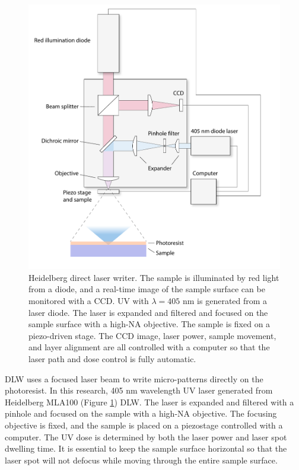 \documentclass[pdflatex, sectionletters, 12pt, final, phd]{pittetd}    %
\begin{document}
\begin{figure}[hp]
	\centering
	\includegraphics[width=1.0\textwidth]{Drawing/Heidelberg.pdf}
	\caption[Heidelberg direct laser writer]{Heidelberg direct laser writer. The sample is illuminated by red light from a diode, and a real-time image of the sample surface can be monitored with a CCD. UV with $\lambda=405$ nm is generated from a laser diode. The laser is expanded and filtered and focused on the sample surface with a high-NA objective. The sample is fixed on a piezo-driven stage. The CCD image, laser power, sample movement, and layer alignment are all controlled with a computer so that the laser path and dose control is fully automatic.}
	\label{FIG:Heidelberg}
\end{figure}

DLW uses a focused laser beam to write micro-patterns directly on the photoresist. In this research, 405 nm wavelength UV laser generated from Heidelberg MLA100 (Figure \ref{FIG:Heidelberg}) DLW. The laser is expanded and filtered with a pinhole and focused on the sample with a high-NA objective. The focusing objective is fixed, and the sample is placed on a piezostage controlled with a computer. The UV dose is determined by both the laser power and laser spot dwelling time. It is essential to keep the sample surface horizontal so that the laser spot will not defocus while moving through the entire sample surface. 
\end{document}
